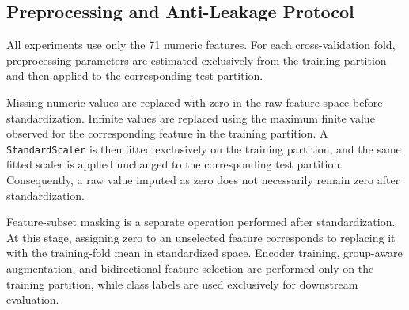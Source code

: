 \subsection{Preprocessing and Anti-Leakage Protocol}
\label{sec:preprocessing}

All experiments use only the 71 numeric features. For each cross-validation fold, preprocessing parameters are estimated exclusively from the training partition and then applied to the corresponding test partition.

Missing numeric values are replaced with zero in the raw feature space before standardization. Infinite values are replaced using the maximum finite value observed for the corresponding feature in the training partition. A \texttt{StandardScaler} is then fitted exclusively on the training partition, and the same fitted scaler is applied unchanged to the corresponding test partition. Consequently, a raw value imputed as zero does not necessarily remain zero after standardization.

Feature-subset masking is a separate operation performed after standardization. At this stage, assigning zero to an unselected feature corresponds to replacing it with the training-fold mean in standardized space. Encoder training, group-aware augmentation, and bidirectional feature selection are performed only on the training partition, while class labels are used exclusively for  downstream evaluation.

